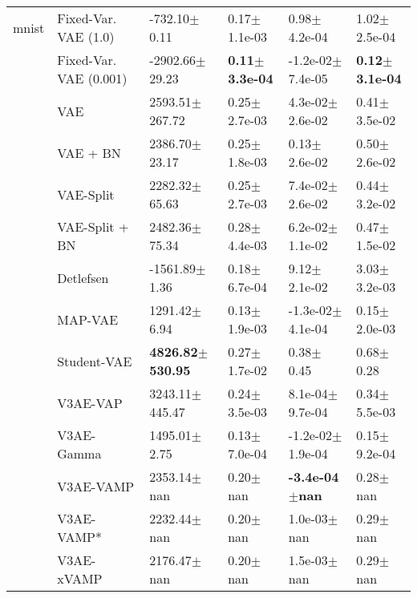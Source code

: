 \begin{tabular}{llllll}
mnist & Fixed-Var. VAE (1.0) &             -732.10$\pm$0.11 &              0.17$\pm$1.1e-03 &               0.98$\pm$4.2e-04 &              1.02$\pm$2.5e-04 \\
             & Fixed-Var. VAE (0.001) &           -2902.66$\pm$29.23 &     \textbf{0.11$\pm$3.3e-04} &           -1.2e-02$\pm$7.4e-05 &     \textbf{0.12$\pm$3.1e-04} \\
             & VAE &           2593.51$\pm$267.72 &              0.25$\pm$2.7e-03 &            4.3e-02$\pm$2.6e-02 &              0.41$\pm$3.5e-02 \\
             & VAE + BN &            2386.70$\pm$23.17 &              0.25$\pm$1.8e-03 &               0.13$\pm$2.6e-02 &              0.50$\pm$2.6e-02 \\
             & VAE-Split &            2282.32$\pm$65.63 &              0.25$\pm$2.7e-03 &            7.4e-02$\pm$2.6e-02 &              0.44$\pm$3.2e-02 \\
             & VAE-Split + BN &            2482.36$\pm$75.34 &              0.28$\pm$4.4e-03 &            6.2e-02$\pm$1.1e-02 &              0.47$\pm$1.5e-02 \\
             & Detlefsen &            -1561.89$\pm$1.36 &              0.18$\pm$6.7e-04 &               9.12$\pm$2.1e-02 &              3.03$\pm$3.2e-03 \\
             & MAP-VAE &             1291.42$\pm$6.94 &              0.13$\pm$1.9e-03 &           -1.3e-02$\pm$4.1e-04 &              0.15$\pm$2.0e-03 \\
             & Student-VAE &  \textbf{4826.82$\pm$530.95} &              0.27$\pm$1.7e-02 &                  0.38$\pm$0.45 &                 0.68$\pm$0.28 \\
             & V3AE-VAP &           3243.11$\pm$445.47 &              0.24$\pm$3.5e-03 &            8.1e-04$\pm$9.7e-04 &              0.34$\pm$5.5e-03 \\
             & V3AE-Gamma &             1495.01$\pm$2.75 &              0.13$\pm$7.0e-04 &           -1.2e-02$\pm$1.9e-04 &              0.15$\pm$9.2e-04 \\
             & V3AE-VAMP &              2353.14$\pm$nan &                  0.20$\pm$nan &      \textbf{-3.4e-04$\pm$nan} &                  0.28$\pm$nan \\
             & V3AE-VAMP* &              2232.44$\pm$nan &                  0.20$\pm$nan &                1.0e-03$\pm$nan &                  0.29$\pm$nan \\
             & V3AE-xVAMP &              2176.47$\pm$nan &                  0.20$\pm$nan &                1.5e-03$\pm$nan &                  0.29$\pm$nan \\

\end{tabular}
